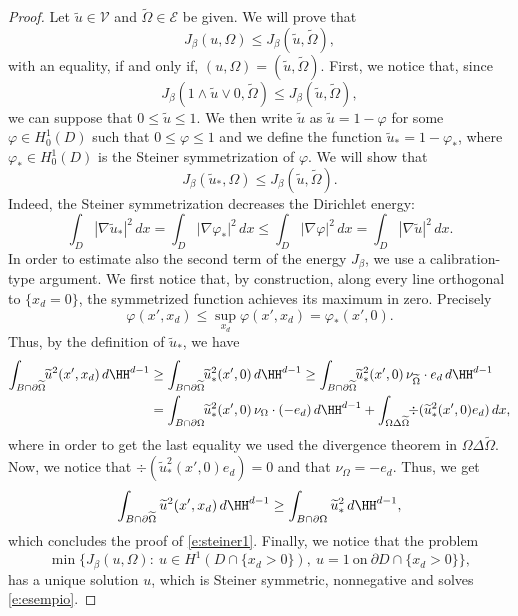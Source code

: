 \begin{proof}
Let $\widetilde u\in \mathcal V$ and $\widetilde\Omega\in \mathcal E$ be given. We will prove that
\[J_\beta(u,\Omega)\le J_\beta(\widetilde u,\widetilde\Omega),\]
with an equality, if and only if, $(u,\Omega)=(\widetilde u,\widetilde\Omega)$. First, we notice that, since
\[
J_\beta(1\wedge\widetilde u\vee0,\widetilde\Omega)\le J_\beta(\widetilde u,\widetilde\Omega),
\]
we can suppose that $0\le \widetilde u\le 1$. We then write $\widetilde u$ as $\widetilde u=1-\varphi$ for some $\varphi\in H^1_0(D)$ such that $0\le \varphi\le 1$ and we define the function $\widetilde u_\ast=1-\varphi_\ast$, where $\varphi_\ast\in H^1_0(D)$ is the Steiner symmetrization of $\varphi$. We will show that
\begin{equation}\label{e:steiner1}
J_\beta(\widetilde u_\ast,\Omega)\le J_\beta(\widetilde u,\widetilde\Omega).
\end{equation}
Indeed, the Steiner symmetrization decreases the Dirichlet energy:
\[\int_D|\nabla \widetilde u_\ast|^2\,dx=\int_D|\nabla \varphi_\ast|^2\,dx\le \int_D|\nabla \varphi|^2\,dx=\int_D|\nabla \widetilde u|^2\,dx.\]
In order to estimate also the second term of the energy $J_\beta$, we use a calibration-type argument.
We first notice that, by construction, along every line orthogonal to $\{x_d=0\}$, the symmetrized function achieves its maximum in zero. Precisely
\[\varphi(x',x_d)\le \sup_{x_d}\varphi(x',x_d)=\varphi_\ast(x',0).\]
Thus, by the definition of $\widetilde u_\ast$, we have
\begin{align*}
\int_{B\cap\partial\widetilde\Omega}\hspace*{-1mm}\widetilde u^2(x',x_d)\,d\HH^{d-1}&\ge \int_{B\cap\partial\widetilde \Omega}\hspace*{-1mm}\widetilde u_\ast^2(x',0)\,d\HH^{d-1}\ge \int_{B\cap\partial\widetilde\Omega}\hspace*{-1mm}\widetilde u_\ast^2(x',0)\,\nu_{\widetilde\Omega}\cdot e_d\,d\HH^{d-1}\\
&= \int_{B\cap\partial\Omega}\hspace*{-1mm}\widetilde u_\ast^2(x',0)\, \nu_{\Omega}\cdot(-e_d)\,d\HH^{d-1}+\int_{\Omega\Delta\widetilde\Omega}\hspace*{-1mm}\div(\widetilde u_\ast^2(x',0)e_d)\,dx,
\end{align*}
where in order to get the last equality we used the divergence theorem in $\Omega\Delta\widetilde\Omega$. Now, we notice that $\div(\widetilde u_\ast^2(x',0)e_d)=0$ and that $\nu_\Omega=-e_d$.
Thus, we get
\[\int_{B\cap\partial\widetilde\Omega}\widetilde u^2(x',x_d)\,d\HH^{d-1}\ge \int_{B\cap\partial\Omega}\widetilde u_\ast^2\,d\HH^{d-1},\]
which concludes the proof of \eqref{e:steiner1}. Finally, we notice that the problem
\begin{equation*}
\min\big\{J_\beta(u,\Omega):\ u\in H^1(D\cap \{x_d>0\}),\ u=1\ \text{on}\ \partial D\cap\{x_d>0\}\big\},
\end{equation*}
has a unique solution $u$, which is Steiner symmetric, nonnegative and solves \eqref{e:esempio}.
\end{proof}

